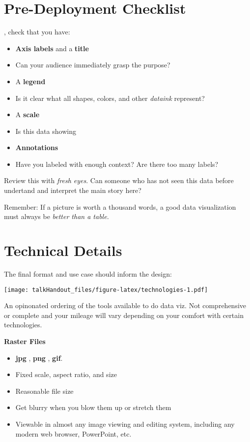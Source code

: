 \documentclass{tufte-handout}
\begin{document}
\section{Pre-Deployment Checklist}\label{pre-deployment-checklist}

, check that you have:

\begin{itemize}
\itemsep1pt\parskip0pt
\item
  \textbf{Axis labels} and a \textbf{title}
\item
  Can your audience immediately grasp the purpose?
\item
  A \textbf{legend}
\item
  Is it clear what all shapes, colors, and other \emph{dataink}
  represent?
\item
  A \textbf{scale}
\item
  Is this data showing
\item
  \textbf{Annotations}
\item
  Have you labeled with enough context? Are there too many labels?
\end{itemize}

Review this with \emph{fresh eyes}. Can someone who has not seen this
data before undertand and interpret the main story here?

Remember: If a picture is worth a thousand words, a good data
visualization must always be \emph{better than a table.}

\section{Technical Details}\label{technical-details}

The final format and use case should inform the design:

\begin{marginfigure}
 \texttt{[image: talkHandout\_files/figure-latex/technologies-1.pdf]}
\caption{An opinonated ordering of the tools available to do data viz. Not comprehensive or complete and your mileage will vary depending on your comfort with certain technologies.}
\end{marginfigure}

\textbf{Raster Files}

\begin{itemize}
\itemsep1pt\parskip0pt
\item
  \textbf{jpg} , \textbf{png} , \textbf{gif}.
\item
  Fixed scale, aspect ratio, and size
\item
  Reasonable file size
\item
  Get blurry when you blow them up or stretch them
\item
  Viewable in almost any image viewing and editing system, including any
  modern web browser, PowerPoint, etc.
\end{itemize}
\end{document}

